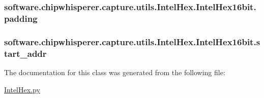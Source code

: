 \subsubsection[{padding}]{\setlength{\rightskip}{0pt plus 5cm}software.\+chipwhisperer.\+capture.\+utils.\+Intel\+Hex.\+Intel\+Hex16bit.\+padding}\label{classsoftware_1_1chipwhisperer_1_1capture_1_1utils_1_1IntelHex_1_1IntelHex16bit_a8c2c4cd2080774693d8fb6916e15c289}
\hypertarget{classsoftware_1_1chipwhisperer_1_1capture_1_1utils_1_1IntelHex_1_1IntelHex16bit_a3e59336acca1f0eb76aedf92df1c1a4e}{}
\subsubsection[{start\+\_\+addr}]{\setlength{\rightskip}{0pt plus 5cm}software.\+chipwhisperer.\+capture.\+utils.\+Intel\+Hex.\+Intel\+Hex16bit.\+start\+\_\+addr}\label{classsoftware_1_1chipwhisperer_1_1capture_1_1utils_1_1IntelHex_1_1IntelHex16bit_a3e59336acca1f0eb76aedf92df1c1a4e}


The documentation for this class was generated from the following file\+:\begin{DoxyCompactItemize}
\item 
\hyperlink{IntelHex_8py}{Intel\+Hex.\+py}\end{DoxyCompactItemize}
